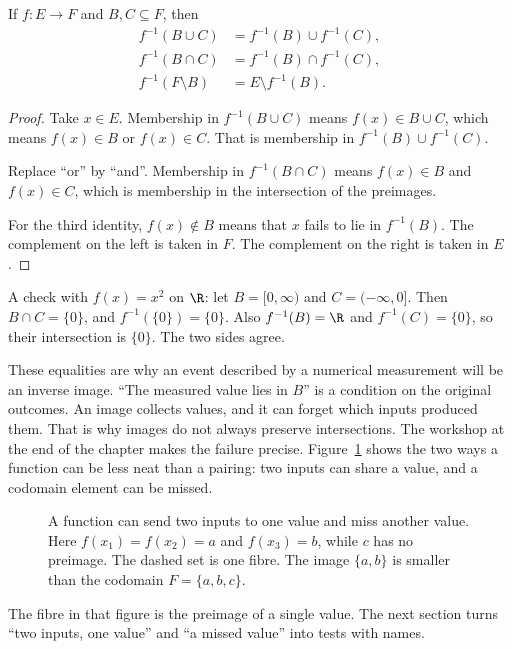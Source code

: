 \begin{proposition}\label{prop:lang-preimages}
If $f:E\to F$ and $B,C\subseteq F$, then
\begin{align*}
f^{-1}(B\cup C)&=f^{-1}(B)\cup f^{-1}(C),\\
f^{-1}(B\cap C)&=f^{-1}(B)\cap f^{-1}(C),\\
f^{-1}(F\setminus B)&=E\setminus f^{-1}(B).
\end{align*}
\end{proposition}
\begin{proof}
Take $x\in E$. Membership in $f^{-1}(B\cup C)$ means $f(x)\in B\cup C$, which means $f(x)\in B$ or $f(x)\in C$. That is membership in $f^{-1}(B)\cup f^{-1}(C)$.

Replace ``or'' by ``and''. Membership in $f^{-1}(B\cap C)$ means $f(x)\in B$ and $f(x)\in C$, which is membership in the intersection of the preimages.

For the third identity, $f(x)\notin B$ means that $x$ fails to lie in $f^{-1}(B)$. The complement on the left is taken in $F$. The complement on the right is taken in $E$.
\end{proof}

A check with $f(x)=x^2$ on $\R$: let $B=[0,\infty)$ and $C=(-\infty,0]$. Then $B\cap C=\{0\}$, and $f^{-1}(\{0\})=\{0\}$. Also $f^{-1}(B)=\R$ and $f^{-1}(C)=\{0\}$, so their intersection is $\{0\}$. The two sides agree.

These equalities are why an event described by a numerical measurement will be an inverse image. ``The measured value lies in $B$'' is a condition on the original outcomes. An image collects values, and it can forget which inputs produced them. That is why images do not always preserve intersections. The workshop at the end of the chapter makes the failure precise. Figure~\ref{fig:language-fibres} shows the two ways a function can be less neat than a pairing: two inputs can share a value, and a codomain element can be missed.

\begin{figure}[ht]
\centering
{}
\caption{A function can send two inputs to one value and miss another value. Here $f(x_1)=f(x_2)=a$ and $f(x_3)=b$, while $c$ has no preimage. The dashed set is one fibre. The image $\{a,b\}$ is smaller than the codomain $F=\{a,b,c\}$.}
\label{fig:language-fibres}
\end{figure}

The fibre in that figure is the preimage of a single value. The next section turns ``two inputs, one value'' and ``a missed value'' into tests with names.

